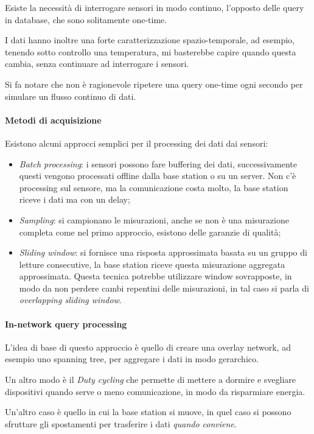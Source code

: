Esiste la necessità di interrogare sensori in modo continuo, l'opposto 
delle query in database, che sono solitamente one-time.

I dati hanno inoltre una forte caratterizzazione spazio-temporale, ad esempio, 
tenendo sotto controllo una temperatura, mi basterebbe capire quando 
questa cambia, senza continuare ad interrogare i sensori.

Si fa notare che non è ragionevole ripetere una query one-time ogni secondo 
per simulare un flusso continuo di dati.

\paragraph{Metodi di acquisizione}
Esistono alcuni approcci semplici per il processing dei dati dai sensori:
\begin{itemize}
    \item \emph{Batch processing}: i sensori possono fare buffering dei dati, 
    successivamente questi 
    vengono processati offline dalla base station
    o su un server.
    Non c'è processing sul sensore, ma la comunicazione 
    costa molto, la base station riceve i dati ma con un delay;
    \item \emph{Sampling}: si campionano le misurazioni, anche se non 
    è una misurazione completa come nel primo approccio, esistono delle garanzie 
    di qualità;
    \item \emph{Sliding window}: si fornisce una risposta approssimata 
    basata su un gruppo di letture consecutive, la base station 
    riceve questa misurazione aggregata approssimata. Questa tecnica potrebbe utilizzare 
    window sovrapposte, in modo da non perdere cambi repentini delle misurazioni, in tal 
    caso si parla di \emph{overlapping sliding window}.
\end{itemize}

\paragraph{In-network query processing}
L'idea di base di questo approccio è quello 
di creare una overlay network, ad esempio uno spanning tree, 
per aggregare i dati in modo gerarchico.

Un altro modo è il \emph{Duty cycling} che permette 
di mettere a dormire e svegliare dispositivi quando serve 
o meno comunicazione, in modo da risparmiare energia.

Un'altro caso è quello in cui la base station si muove, 
in quel caso si possono sfruttare gli spostamenti per 
trasferire i dati \emph{quando conviene}.

